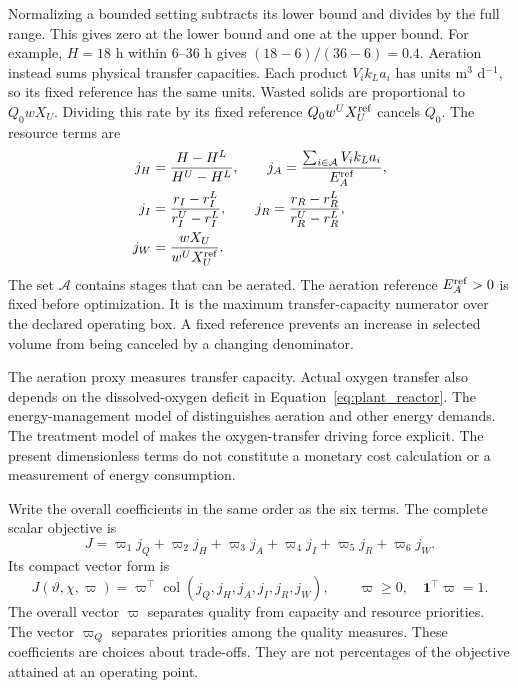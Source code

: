 Normalizing a bounded setting subtracts its lower bound and divides by the full range. This gives zero at the lower bound and one at the upper bound. For example, $H=18$ h within 6--36 h gives $(18-6)/(36-6)=0.4$. Aeration instead sums physical transfer capacities. Each product $V_i k_La_i$ has units m$^3$ d$^{-1}$, so its fixed reference has the same units. Wasted solids are proportional to $Q_0wX_U$. Dividing this rate by its fixed reference $Q_0w^UX_U^{\rm ref}$ cancels $Q_0$. The resource terms are
\begin{align}
j_H&=\frac{H-H^L}{H^U-H^L},\qquad
j_A=\frac{\sum_{i\in\mathcal A}V_i k_La_i}{E_A^{\rm ref}},\\
j_I&=\frac{r_I-r_I^L}{r_I^U-r_I^L},\qquad
j_R=\frac{r_R-r_R^L}{r_R^U-r_R^L},\\
j_W&=\frac{wX_U}{w^UX_U^{\rm ref}}.
\label{eq:plant_resource_objective}
\end{align}
The set $\mathcal A$ contains stages that can be aerated. The aeration reference $E_A^{\rm ref}>0$ is fixed before optimization. It is the maximum transfer-capacity numerator over the declared operating box. A fixed reference prevents an increase in selected volume from being canceled by a changing denominator.

The aeration proxy measures transfer capacity. Actual oxygen transfer also depends on the dissolved-oxygen deficit in Equation~\eqref{eq:plant_reactor}. The energy-management model of \citet{Miederer2025} distinguishes aeration and other energy demands. The treatment model of \citet{Zhang2026} makes the oxygen-transfer driving force explicit. The present dimensionless terms do not constitute a monetary cost calculation or a measurement of energy consumption.

Write the overall coefficients in the same order as the six terms. The complete scalar objective is
\begin{equation}
J=\varpi_1j_Q+\varpi_2j_H+\varpi_3j_A+\varpi_4j_I+\varpi_5j_R+\varpi_6j_W.
\end{equation}
Its compact vector form is
\begin{equation}
J(\vartheta,\chi,\varpi)=\varpi^\top
\operatorname{col}(j_Q,j_H,j_A,j_I,j_R,j_W),\qquad
\varpi\ge0,\quad\mathbf1^\top\varpi=1.
\label{eq:plant_engineering_objective}
\end{equation}
The overall vector $\varpi$ separates quality from capacity and resource priorities. The vector $\varpi_Q$ separates priorities among the quality measures. These coefficients are choices about trade-offs. They are not percentages of the objective attained at an operating point.

